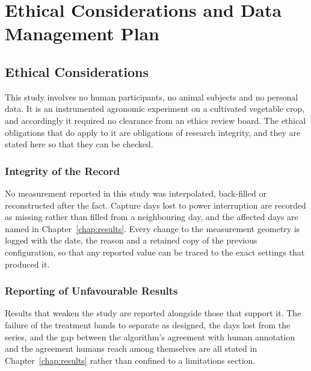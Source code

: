 \chapter{Ethical Considerations and Data Management Plan}
\label{app:ethics}

\section{Ethical Considerations}

This study involves no human participants, no animal subjects and no personal
data. It is an instrumented agronomic experiment on a cultivated vegetable
crop, and accordingly it required no clearance from an ethics review board.
The ethical obligations that do apply to it are obligations of research
integrity, and they are stated here so that they can be checked.


\subsection{Integrity of the Record}

No measurement reported in this study was interpolated, back-filled or
reconstructed after the fact. Capture days lost to power interruption are
recorded as missing rather than filled from a neighbouring day, and the
affected days are named in Chapter~\ref{chap:results}. Every change to the
measurement geometry is logged with the date, the reason and a retained copy
of the previous configuration, so that any reported value can be traced to the
exact settings that produced it.

\subsection{Reporting of Unfavourable Results}

Results that weaken the study are reported alongside those that support it.
The failure of the treatment bands to separate as designed, the days lost from
the series, and the gap between the algorithm's agreement with human
annotation and the agreement humans reach among themselves are all stated in
Chapter~\ref{chap:results} rather than confined to a limitations section.

